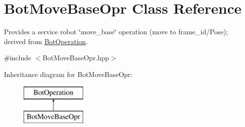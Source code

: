 \hypertarget{classBotMoveBaseOpr}{\section{Bot\-Move\-Base\-Opr Class Reference}
\label{classBotMoveBaseOpr}
}


Provides a service robot \char`\"{}move\-\_\-base\char`\"{} operation (move to frame\-\_\-id/\-Pose); derived from \hyperlink{classBotOperation}{Bot\-Operation}.  




{\ttfamily \#include $<$Bot\-Move\-Base\-Opr.\-hpp$>$}

Inheritance diagram for Bot\-Move\-Base\-Opr\-:\begin{figure}[H]
\begin{center}
\leavevmode
\includegraphics[height=2.000000cm]{classBotMoveBaseOpr}
\end{center}
\end{figure}
